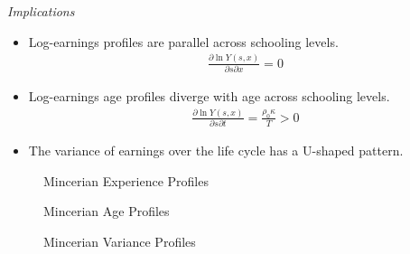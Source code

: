 \begin{frame}\begin{center}
\LARGE\textit{Implications}
\end{center}\end{frame}



\begin{frame}
\begin{itemize}
\item Log-earnings profiles are parallel across schooling levels.
\begin{align*}
\frac{\partial \ln Y(s, x)}{\partial s \partial x} = 0
\end{align*}
\item Log-earnings age profiles diverge with age across schooling levels.
\begin{align*}
\frac{\partial \ln Y(s, x)}{\partial s \partial t} = \frac{\rho_0\kappa}{T} > 0
\end{align*}
\item The variance of earnings over the life cycle has a U-shaped pattern.
\end{itemize}
\end{frame}


\begin{frame}
\begin{figure}[htp]\centering
\caption{Mincerian Experience Profiles}\label{Mincerian Experience Profiles}
\end{figure}
\end{frame}

\begin{frame}
\begin{figure}[htp]\centering
\caption{Mincerian Age Profiles}\label{Mincerian Age Profiles}
\end{figure}
\end{frame}


\begin{frame}
\begin{figure}[htp]\centering
\caption{Mincerian Variance Profiles}\label{Mincerian Variance Profiles}
\end{figure}
\end{frame}

